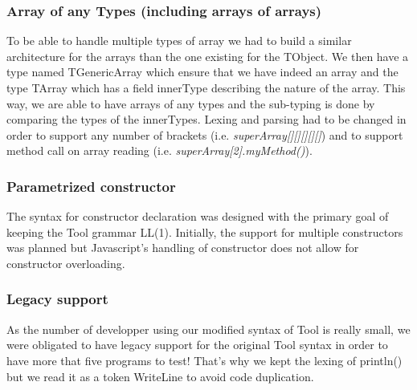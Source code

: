 \subsubsection{Array of any Types (including arrays of arrays)}
To be able to handle multiple types of array we had to build a similar architecture for the arrays than the one existing for the TObject. We then have a type named TGenericArray which ensure that we have indeed an array and the type TArray which has a field innerType describing the nature of the array.
This way, we are able to have arrays of any types and the sub-typing is done by comparing the types of the innerTypes.
Lexing and parsing had to be changed in order to support any number of brackets (i.e. \emph{superArray[][][][][]}) and to support method call on array reading (i.e. \emph{superArray[2].myMethod()}).

\subsubsection{Parametrized constructor}
The syntax for constructor declaration was designed with the primary
goal of keeping the Tool grammar LL(1). Initially, the support for
multiple constructors was planned but Javascript's handling of
constructor does not allow for constructor overloading.

\subsubsection{Legacy support}
As the number of developper using our modified syntax of Tool is really small, we were obligated to have legacy support for the original Tool syntax in order to have more that five programs to test!
That's why we kept the lexing of println() but we read it as a token WriteLine to avoid code duplication.
